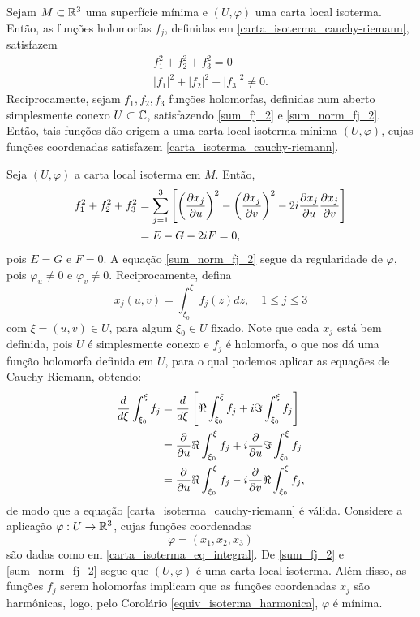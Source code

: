 \begin{lema}\label{lema_fj_2}
	Sejam $M \subset \mathbb{R}^3$ uma superfície mínima e $(U, \varphi)$ uma carta local isoterma. Então, as funções holomorfas $f_j$, definidas em \eqref{carta_isoterma_cauchy-riemann}, satisfazem
	\begin{gather}\label{sum_fj_2}
	f_1^2 + f_2^2 + f_3^2 = 0\\ \label{sum_norm_fj_2}
	|f_1|^2 + |f_2|^2 + |f_3|^2 \neq 0.
	\end{gather}
	Reciprocamente, sejam $f_1, f_2, f_3$ funções holomorfas, definidas num aberto simplesmente conexo $U \subset \mathbb{C}$, satisfazendo \eqref{sum_fj_2} e \eqref{sum_norm_fj_2}. Então, tais funções dão origem a uma carta local isoterma mínima $(U, \varphi)$, cujas funções coordenadas satisfazem \eqref{carta_isoterma_cauchy-riemann}.
\end{lema}

\begin{demonstracao}
	Seja $(U, \varphi)$ a carta local isoterma em $M$. Então,
	\begin{align*}
	f_1^2 + f_2^2 + f_3^2 &= \sum_{j=1}^{3} \left[ \left( \frac{\partial x_j}{\partial u} \right)^2 - \left( \frac{\partial x_j}{\partial v} \right)^2 - 2i \frac{\partial x_j}{\partial u} \frac{\partial x_j}{\partial v} \right]\\
	&= E - G - 2iF = 0,
	\end{align*}
	pois $E=G$ e $F=0$. A equação \eqref{sum_norm_fj_2} segue da regularidade de $\varphi$, pois $\varphi_u \neq 0$ e $\varphi_v \neq 0$.
	Reciprocamente, defina
	\begin{equation}\label{carta_isoterma_eq_integral}
	x_j(u,v) = \int_{\xi_0}^{\xi} f_j(z) dz, \quad 1 \leq j \leq 3
	\end{equation}
	com $\xi = (u,v) \in U$, para algum $\xi_0 \in U$ fixado. Note que cada $x_j$ está bem definida, pois $U$ é simplesmente conexo e $f_j$ é holomorfa, o que nos dá uma função holomorfa definida em $U$, para o qual podemos aplicar as equações de Cauchy-Riemann, obtendo:
	\begin{align*}
	\frac{d}{d \xi} \int_{\xi_0}^{\xi} f_j &= \frac{d}{d \xi} \left[ \Re \int_{\xi_0}^{\xi} f_j + i \Im \int_{\xi_0}^{\xi} f_j \right]\\
	&= \frac{\partial}{\partial u} \Re \int_{\xi_0}^{\xi} f_j + i \frac{\partial}{\partial u} \Im \int_{\xi_0}^{\xi} f_j\\
	&= \frac{\partial}{\partial u} \Re \int_{\xi_0}^{\xi} f_j - i \frac{\partial}{\partial v} \Re \int_{\xi_0}^{\xi} f_j,
	\end{align*}
	de modo que a equação \eqref{carta_isoterma_cauchy-riemann} é válida. Considere a aplicação $\varphi: U \rightarrow \mathbb{R}^3$, cujas funções coordenadas
	\begin{equation*}
	\varphi = (x_1,x_2,x_3)
	\end{equation*}
	são dadas como em \eqref{carta_isoterma_eq_integral}. De \eqref{sum_fj_2} e \eqref{sum_norm_fj_2} segue que $(U,\varphi)$ é uma carta local isoterma. Além disso, as funções $f_j$ serem holomorfas implicam que as funções coordenadas $x_j$ são harmônicas, logo, pelo Corolário \ref{equiv_isoterma_harmonica}, $\varphi$ é mínima.
\end{demonstracao}

